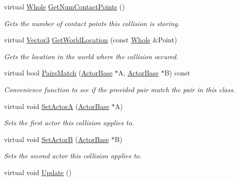 \begin{DoxyCompactItemize}
virtual \hyperlink{namespaceMezzanine_adcbb6ce6d1eb4379d109e51171e2e493}{Whole} \hyperlink{classMezzanine_1_1Collision_a75c8f35acf6ceba61b62da0049dcbf1c}{GetNumContactPoints} ()
\begin{DoxyCompactList}\small\item\em Gets the number of contact points this collision is storing. \item\end{DoxyCompactList}\item 
virtual \hyperlink{classMezzanine_1_1Vector3}{Vector3} \hyperlink{classMezzanine_1_1Collision_abefbe2ba9b0aaa1830be4f1070c44480}{GetWorldLocation} (const \hyperlink{namespaceMezzanine_adcbb6ce6d1eb4379d109e51171e2e493}{Whole} \&Point)
\begin{DoxyCompactList}\small\item\em Gets the location in the world where the collision occured. \item\end{DoxyCompactList}\item 
virtual bool \hyperlink{classMezzanine_1_1Collision_a7834ded06e5313712f5d18a565d7519e}{PairsMatch} (\hyperlink{classMezzanine_1_1ActorBase}{ActorBase} $\ast$A, \hyperlink{classMezzanine_1_1ActorBase}{ActorBase} $\ast$B) const 
\begin{DoxyCompactList}\small\item\em Convenience function to see if the provided pair match the pair in this class. \item\end{DoxyCompactList}\item 
virtual void \hyperlink{classMezzanine_1_1Collision_a0d6af6364ddf665a8696b6addcfd6b17}{SetActorA} (\hyperlink{classMezzanine_1_1ActorBase}{ActorBase} $\ast$A)
\begin{DoxyCompactList}\small\item\em Sets the first actor this collision applies to. \item\end{DoxyCompactList}\item 
virtual void \hyperlink{classMezzanine_1_1Collision_a63a9d2fe2e1a10d4fa874a1272ad7ad1}{SetActorB} (\hyperlink{classMezzanine_1_1ActorBase}{ActorBase} $\ast$B)
\begin{DoxyCompactList}\small\item\em Sets the second actor this collision applies to. \item\end{DoxyCompactList}\item 
\hypertarget{classMezzanine_1_1Collision_afee98e7728b4f2a4865a2ef38a051577}{
virtual void \hyperlink{classMezzanine_1_1Collision_afee98e7728b4f2a4865a2ef38a051577}{Update} ()}
\label{classMezzanine_1_1Collision_afee98e7728b4f2a4865a2ef38a051577}


\end{DoxyCompactItemize}
